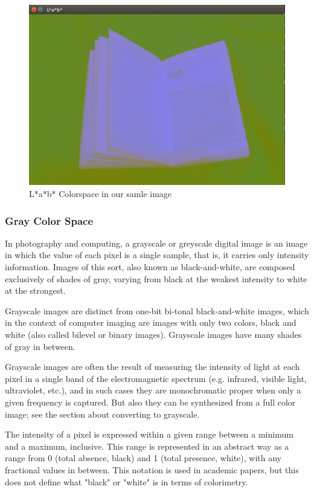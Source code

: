\documentclass[BTech]{srmuthesis}
\begin{document}
\begin{figure}[!hb]
    \centering
    \includegraphics[width=15cm\textwidth]{lab_colorspace}
    \caption{L*a*b* Colorspace in our samle image}
    \label{fig:L*a*b* Colorspace}
\end{figure}

\subsubsection{Gray Color Space}

In photography and computing, a grayscale or greyscale digital image is an image in which the value of each pixel is a single sample, that is, it carries only intensity information. Images of this sort, also known as black-and-white, are composed exclusively of shades of gray, varying from black at the weakest intensity to white at the strongest.

Grayscale images are distinct from one-bit bi-tonal black-and-white images, which in the context of computer imaging are images with only two colors, black and white (also called bilevel or binary images). Grayscale images have many shades of gray in between.

Grayscale images are often the result of measuring the intensity of light at each pixel in a single band of the electromagnetic spectrum (e.g. infrared, visible light, ultraviolet, etc.), and in such cases they are monochromatic proper when only a given frequency is captured. But also they can be synthesized from a full color image; see the section about converting to grayscale.

The intensity of a pixel is expressed within a given range between a minimum and a maximum, inclusive. This range is represented in an abstract way as a range from 0 (total absence, black) and 1 (total presence, white), with any fractional values in between. This notation is used in academic papers, but this does not define what "black" or "white" is in terms of colorimetry.
\end{document}
